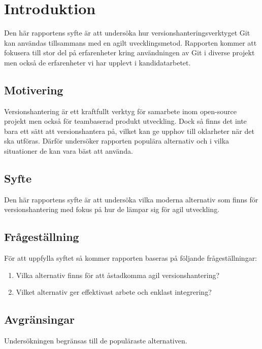 \section{Introduktion}
\label{sec:bjorn-introduction}

Den här rapportens syfte är att undersöka hur versionshanteringsverktyget Git kan användas tillsammans med en agilt uvecklingsmetod. Rapporten kommer att fokusera till stor del på erfarenheter kring användningen av Git i diverse projekt men också de erfarenheter vi har upplevt i kandidatarbetet.

\subsection{Motivering}
\label{subsec:motivation}

Versionshantering är ett kraftfullt verktyg för samarbete inom open-source projekt men också för teambaserad produkt utveckling. Dock så finns det inte bara ett sätt att versionshantera på, vilket kan ge upphov till oklarheter när det ska utföras. Därför undersöker rapporten populära alternativ och i vilka situationer de kan vara bäst att använda.

\subsection{Syfte}
\label{subsec:reason}
Den här rapportens syfte är att undersöka vilka moderna alternativ som finns för versionshantering med fokus på hur de lämpar sig för agil utveckling.

\subsection{Frågeställning}
\label{subsec:research-questions}

För att uppfylla syftet så kommer rapporten baseras på följande frågeställningar:

\begin{enumerate}
\item Vilka alternativ finns för att åstadkomma agil versionshantering?

\item Vilket alternativ ger effektivast arbete och enklast integrering?
\end{enumerate}

\subsection{Avgränsingar}
\label{subsec:delimitations}

Undersökningen begränsas till de populäraste alternativen.